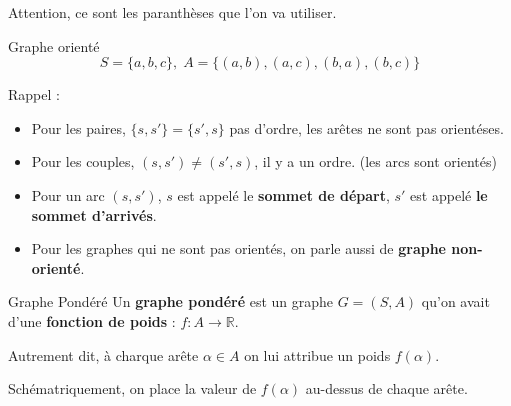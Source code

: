 Attention, ce sont les paranthèses que l'on va utiliser.
\begin{Example}{Graphe orienté}{}
\[
    S = \{a,b,c\}, \; A = \{(a,b),(a,c),(b,a),(b,c)\}
\]

\begin{center}
\end{center}


\end{Example}

Rappel :
 \begin{itemize}
     \item Pour les paires, $\{s, s'\} = \{s', s\}$ pas d'ordre, les arêtes ne sont pas orientéses.
    \item Pour les couples,  $(s, s') \ne (s', s)$, il y a un ordre. (les arcs sont orientés)
    \item Pour un arc  $(s, s')$,  $s$ est appelé le \textbf{sommet de départ}, $s'$ est appelé \textbf{le sommet d'arrivés}.
 \end{itemize}

\begin{note}
\begin{itemize}
    \item Pour les graphes qui ne sont pas orientés, on parle aussi de \textbf{graphe non-orienté}.
\end{itemize}
\end{note}

\begin{Definition}[colbacktitle=red!75!black]{Graphe Pondéré}{}
Un \textbf{graphe pondéré} est un graphe $G = (S,A)$ qu'on avait d'une  \textbf{fonction de poids} : $f :A \longrightarrow \mathbb{R}$.

Autrement dit, à charque arête $\alpha \in A$ on lui attribue un poids  $f( \alpha )$.

Schématriquement, on place la valeur de $f( \alpha )$ au-dessus de chaque arête.
\end{Definition}

